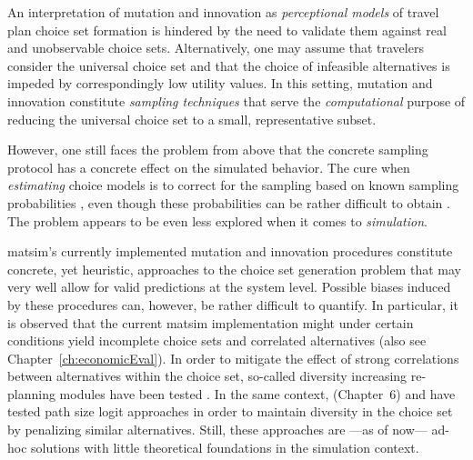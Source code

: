 An interpretation of mutation and innovation as
\emph{perceptional models} of travel plan choice set formation is hindered by
the need to validate them against real and unobservable choice sets.
Alternatively, one may assume that travelers consider the universal choice set and that the choice of infeasible 
alternatives is impeded by correspondingly low utility values. In this setting, mutation and innovation
constitute \emph{sampling techniques} that serve the \emph{computational} purpose of reducing the universal choice
set to a small, representative subset.

However, one still faces the problem from above that the concrete sampling protocol has a concrete effect on the simulated behavior. The cure when \emph{estimating} choice models is to correct for the sampling based on known sampling probabilities \citep[e.g.][Chapter 9]{ben-akiva-1985}, even though these probabilities can be rather difficult to obtain \citep{floetteroed-2012b, frejinger-2009}. The problem appears to be even less explored when it comes to \emph{simulation}. 

\gls{matsim}'s currently implemented mutation and innovation procedures
constitute concrete, yet heuristic, approaches to the choice set generation
problem that may very well allow for valid predictions at the system level.
%
%
%
Possible biases induced by these procedures can, however, be rather difficult to quantify.
%
%
In particular, it is observed that the current \gls{matsim} implementation might under certain conditions yield incomplete choice sets and correlated alternatives (also see Chapter~\ref{ch:economicEval}).
%
In order to mitigate the effect of strong correlations between alternatives within the choice set, so-called diversity increasing re-planning modules have been tested \citep[see, e.g.,][]{NagelKickhoeferJoubert2014HeterogeneousVoTsPROCEDIA}. In the same context, \cite{Grether_PhDThesis_2014} (Chapter~6) and \cite{NeumannEtAlPassengerArrivalPatterns} have tested path size logit approaches \citep[see, e.g.,][]{DaganzoSheffi_TransScience_1977,FrejingerBierlaire_TransResB_2007} in order to maintain diversity in the choice set by penalizing similar alternatives.
%
Still, these approaches are ---as of now--- ad-hoc solutions with little theoretical foundations in the simulation context.

